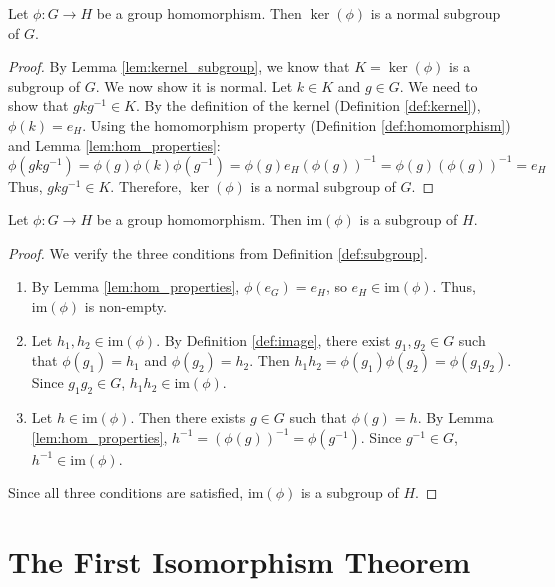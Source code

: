 \begin{lemma}
\label{lem:kernel_normal}
Let $\phi: G \to H$ be a group homomorphism. Then $\ker(\phi)$ is a normal subgroup of $G$.
\end{lemma}
\begin{proof}
By Lemma \ref{lem:kernel_subgroup}, we know that $K = \ker(\phi)$ is a subgroup of $G$. We now show it is normal. Let $k \in K$ and $g \in G$. We need to show that $gkg^{-1} \in K$.
By the definition of the kernel (Definition \ref{def:kernel}), $\phi(k) = e_H$. Using the homomorphism property (Definition \ref{def:homomorphism}) and Lemma \ref{lem:hom_properties}:
$$ \phi(gkg^{-1}) = \phi(g)\phi(k)\phi(g^{-1}) = \phi(g)e_H(\phi(g))^{-1} = \phi(g)(\phi(g))^{-1} = e_H $$
Thus, $gkg^{-1} \in K$. Therefore, $\ker(\phi)$ is a normal subgroup of $G$.
\end{proof}

\begin{lemma}
\label{lem:image_subgroup}
Let $\phi: G \to H$ be a group homomorphism. Then $\text{im}(\phi)$ is a subgroup of $H$.
\end{lemma}
\begin{proof}
We verify the three conditions from Definition \ref{def:subgroup}.
\begin{enumerate}
    \item By Lemma \ref{lem:hom_properties}, $\phi(e_G) = e_H$, so $e_H \in \text{im}(\phi)$. Thus, $\text{im}(\phi)$ is non-empty.
    \item Let $h_1, h_2 \in \text{im}(\phi)$. By Definition \ref{def:image}, there exist $g_1, g_2 \in G$ such that $\phi(g_1) = h_1$ and $\phi(g_2) = h_2$. Then $h_1 h_2 = \phi(g_1)\phi(g_2) = \phi(g_1 g_2)$. Since $g_1 g_2 \in G$, $h_1 h_2 \in \text{im}(\phi)$.
    \item Let $h \in \text{im}(\phi)$. Then there exists $g \in G$ such that $\phi(g) = h$. By Lemma \ref{lem:hom_properties}, $h^{-1} = (\phi(g))^{-1} = \phi(g^{-1})$. Since $g^{-1} \in G$, $h^{-1} \in \text{im}(\phi)$.
\end{enumerate}
Since all three conditions are satisfied, $\text{im}(\phi)$ is a subgroup of $H$.
\end{proof}

\section{The First Isomorphism Theorem}

